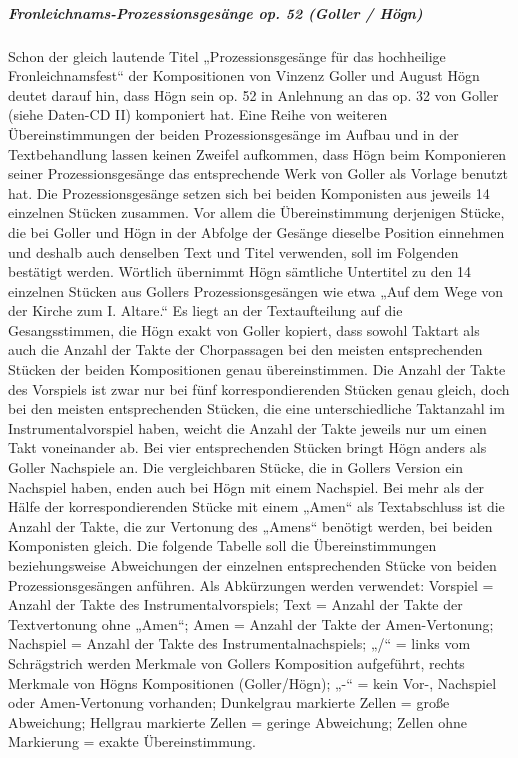 \documentclass[a4paper]{article}
\begin{document}
\subparagraph{Fronleichnams-Prozessionsgesänge op. 52 (Goller / Högn)}
Schon der gleich lautende Titel „Prozessionsgesänge für das hochheilige
Fronleichnamsfest“ der Kompositionen von Vinzenz Goller und August Högn
deutet darauf hin, dass Högn sein op. 52 in Anlehnung an das op. 32 von
Goller (siehe Daten-CD II) komponiert hat. Eine Reihe von weiteren
Übereinstimmungen der beiden Prozessionsgesänge im Aufbau und in der
Textbehandlung lassen keinen Zweifel aufkommen, dass Högn beim
Komponieren seiner Prozessionsgesänge das entsprechende Werk von Goller
als Vorlage benutzt hat. Die Prozessionsgesänge setzen sich bei beiden
Komponisten aus jeweils 14 einzelnen Stücken zusammen. Vor allem die
Übereinstimmung derjenigen Stücke, die bei Goller und Högn in der
Abfolge der Gesänge dieselbe Position einnehmen und deshalb auch
denselben Text und Titel verwenden, soll im Folgenden bestätigt werden.
Wörtlich übernimmt Högn sämtliche Untertitel zu den 14 einzelnen
Stücken aus Gollers Prozessionsgesängen wie etwa „Auf dem Wege von der
Kirche zum I. Altare.“ Es liegt an der Textaufteilung auf die
Gesangsstimmen, die Högn exakt von Goller kopiert, dass sowohl Taktart
als auch die Anzahl der Takte der Chorpassagen bei den meisten
entsprechenden Stücken der beiden Kompositionen genau übereinstimmen.
Die Anzahl der Takte des Vorspiels ist zwar nur bei fünf
korrespondierenden Stücken genau gleich, doch bei den meisten
entsprechenden Stücken, die eine unterschiedliche Taktanzahl im
Instrumentalvorspiel haben, weicht die Anzahl der Takte jeweils nur um
einen Takt voneinander ab. Bei vier entsprechenden Stücken bringt Högn
anders als Goller Nachspiele an. Die vergleichbaren Stücke, die in
Gollers Version ein Nachspiel haben, enden auch bei Högn mit einem
Nachspiel. Bei mehr als der Hälfe der korrespondierenden Stücke mit
einem „Amen“ als Textabschluss ist die Anzahl der Takte, die zur
Vertonung des „Amens“ benötigt werden, bei beiden Komponisten gleich.
Die folgende Tabelle soll die Übereinstimmungen beziehungsweise
Abweichungen der einzelnen entsprechenden Stücke von beiden
Prozessionsgesängen anführen. Als Abkürzungen werden verwendet:
Vorspiel = Anzahl der Takte des Instrumentalvorspiels; Text = Anzahl
der Takte der Textvertonung ohne „Amen“; Amen = Anzahl der Takte der
Amen-Vertonung; Nachspiel = Anzahl der Takte des
Instrumentalnachspiels; „/“ = links vom Schrägstrich werden Merkmale
von Gollers Komposition aufgeführt, rechts Merkmale von Högns
Kompositionen (Goller/Högn); „-“ = kein Vor-, Nachspiel oder
Amen-Vertonung vorhanden; Dunkelgrau markierte Zellen = große
Abweichung; Hellgrau markierte Zellen = geringe Abweichung; Zellen ohne
Markierung = exakte Übereinstimmung.
\end{document}
